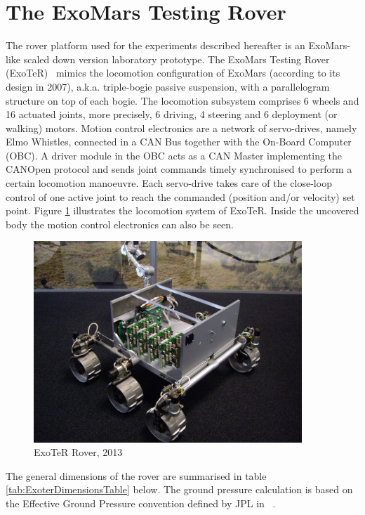 \documentclass[a4paper,twocolumn]{esapub2005} %
\begin{document}
\section{The ExoMars Testing Rover}

The rover platform used for the experiments described hereafter is an
ExoMars-like scaled down version laboratory prototype. The ExoMars Testing
Rover (ExoTeR)~\cite{Azkarate2015} mimics the locomotion configuration of
ExoMars (according to its design in 2007), a.k.a. triple-bogie passive
suspension, with a parallelogram structure on top of each bogie. The locomotion
subsystem comprises 6 wheels and 16 actuated joints, more precisely, 6 driving,
4 steering and 6 deployment (or walking) motors.  Motion control electronics
are a network of servo-drives, namely Elmo Whistles, connected in a CAN Bus
together with the On-Board Computer (OBC). A driver module in the OBC acts as a CAN
Master implementing the CANOpen protocol and sends joint commands timely
synchronised to perform a certain locomotion manoeuvre. Each servo-drive takes
care of the close-loop control of one active joint to reach the commanded
(position and/or velocity) set point.  Figure \ref{fig:ExoterRover2013} illustrates the locomotion
system of ExoTeR. Inside the uncovered body the motion control electronics can
also be seen.

\begin{figure}[h!]
    \centering
    \includegraphics[width=0.9\textwidth]{ExoterRover2013.jpg}
    \caption{ExoTeR Rover, 2013}
    \label{fig:ExoterRover2013}
\end{figure}

The general dimensions of the rover are summarised in table \ref{tab:ExoterDimensionsTable} below. The ground pressure calculation is based on the Effective Ground Pressure convention defined by JPL in ~\cite{ROB:ROB21481}.
\end{document}
